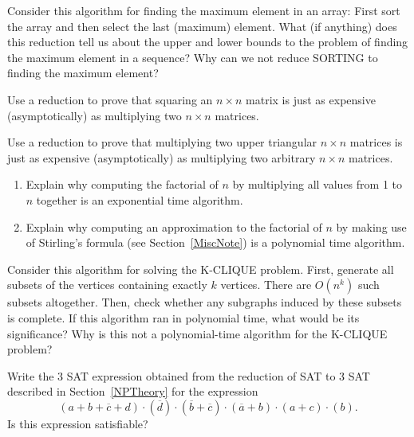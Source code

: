 \begin{exercises}

\item
Consider this algorithm for finding the maximum element in an array:
First sort the array and then select the last (maximum)
element.
What (if anything) does this reduction tell us about the upper and
lower bounds to the problem of finding the maximum element in a sequence?
Why can we not reduce SORTING to finding the maximum element?

\item
Use a reduction to prove that squaring an
\(n \times n\) matrix is just as expensive (asymptotically) as
multiplying two \(n \times n\) matrices.

\item
Use a reduction to prove that multiplying two upper triangular
\(n \times n\) matrices is just as expensive (asymptotically) as
multiplying two arbitrary \(n \times n\) matrices.

\item
\begin{enumerate}
\item
Explain why computing the factorial of \(n\) by multiplying all values
from 1 to \(n\) together is an exponential time
algorithm.

\item
Explain why computing an approximation to the factorial of \(n\) by
making use of Stirling's formula (see Section~\ref{MiscNote})
is a polynomial time algorithm.
\end{enumerate}

\item
Consider this algorithm for solving the K-CLIQUE problem.
First, generate all subsets of the vertices containing exactly \(k\)
vertices.
There are \(O(n^k)\) such subsets altogether.
Then, check whether any subgraphs induced by these subsets is
complete.
If this algorithm ran in polynomial time, what would be its
significance?
Why is this not a polynomial-time algorithm for the K-CLIQUE problem?

\item
Write the 3 SAT expression obtained from the reduction of SAT to 3 SAT
described in Section~\ref{NPTheory} for the expression
\[(a + b + \overline{c} + d) \cdot (\overline{d}) \cdot
(\overline{b} + \overline{c}) \cdot (\overline{a} + b) \cdot
(a + c) \cdot (b).\]
\noindent Is this expression satisfiable?


\end{exercises}
